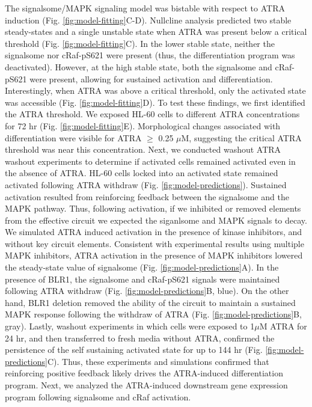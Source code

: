 \documentclass[12pt]{article}
\begin{document}
The signalsome/MAPK signaling model was bistable with respect to ATRA induction (Fig. \ref{fig:model-fitting}C-D).
Nullcline analysis predicted two stable steady-states and a single unstable state when ATRA was present below a critical threshold (Fig. \ref{fig:model-fitting}C).
In the lower stable state, neither the signalsome nor cRaf-pS621 were present (thus, the differentiation program was deactivated).
However, at the high stable state, both the signalsome and cRaf-pS621 were present, allowing for sustained activation and differentiation.
Interestingly, when ATRA was above a critical threshold, only the activated state was accessible (Fig. \ref{fig:model-fitting}D).
To test these findings, we first identified the ATRA threshold. We exposed HL-60 cells to different ATRA concentrations for 72 hr (Fig. \ref{fig:model-fitting}E).
Morphological changes associated with differentiation were visible for ATRA $\geq$ 0.25 $\mu$M, suggesting the critical ATRA
threshold was near this concentration. Next, we conducted washout ATRA washout experiments to determine if activated cells remained activated even in the absence of ATRA.
HL-60 cells locked into an activated state remained activated following ATRA withdraw (Fig. \ref{fig:model-predictions}).
Sustained activation resulted from reinforcing feedback between the signalsome and the MAPK pathway.
Thus, following activation, if we inhibited or removed elements from the effective circuit we expected the siganlsome and MAPK signals to decay.
We simulated ATRA induced activation in the presence of kinase inhibitors, and without key circuit elements.
Consistent with experimental results using multiple MAPK inhibitors, ATRA activation in the presence of MAPK inhibitors lowered the steady-state value of signalsome (Fig. \ref{fig:model-predictions}A).
In the presence of BLR1, the signalsome and cRaf-pS621 signals were maintained following ATRA withdraw (Fig. \ref{fig:model-predictions}B, blue).
On the other hand, BLR1 deletion removed the ability of the circuit to maintain a sustained MAPK response following the withdraw of ATRA (Fig. \ref{fig:model-predictions}B, gray).
Lastly, washout experiments in which cells were exposed to 1$\mu$M ATRA for 24 hr, and then transferred to fresh media without ATRA,
confirmed the persistence of the self sustaining activated state for up to 144 hr (Fig. \ref{fig:model-predictions}C).
Thus, these experiments and simulations confirmed that reinforcing positive feedback likely drives the ATRA-induced differentiation program.
Next, we analyzed the ATRA-induced downstream gene expression program following signalsome and cRaf activation.
\end{document}
